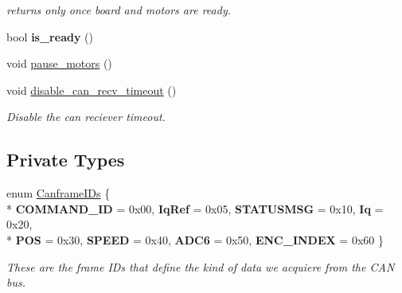 \begin{DoxyCompactItemize}
\begin{DoxyCompactList}\small\item\em returns only once board and motors are ready. \end{DoxyCompactList}\item 
bool {\bfseries is\+\_\+ready} ()\hypertarget{classblmc__drivers_1_1CanBusMotorBoard_aecd2ba0d3d1f40ffd38a0fd47b8da55d}{}\label{classblmc__drivers_1_1CanBusMotorBoard_aecd2ba0d3d1f40ffd38a0fd47b8da55d}

\item 
void \hyperlink{classblmc__drivers_1_1CanBusMotorBoard_a19ffd7d9ef9a441299164485e85ec6fd}{pause\+\_\+motors} ()
\item 
void \hyperlink{classblmc__drivers_1_1CanBusMotorBoard_a846382d2ad74d2087f5557ecd90937e3}{disable\+\_\+can\+\_\+recv\+\_\+timeout} ()\hypertarget{classblmc__drivers_1_1CanBusMotorBoard_a846382d2ad74d2087f5557ecd90937e3}{}\label{classblmc__drivers_1_1CanBusMotorBoard_a846382d2ad74d2087f5557ecd90937e3}

\begin{DoxyCompactList}\small\item\em Disable the can reciever timeout. \end{DoxyCompactList}\end{DoxyCompactItemize}
\subsection*{Private Types}
\begin{DoxyCompactItemize}
\item 
enum \hyperlink{classblmc__drivers_1_1CanBusMotorBoard_addbf32fe0b6fa57134546c1f6ec5eb80}{Canframe\+I\+Ds} \{ \\*
{\bfseries C\+O\+M\+M\+A\+N\+D\+\_\+\+ID} = 0x00, 
{\bfseries Iq\+Ref} = 0x05, 
{\bfseries S\+T\+A\+T\+U\+S\+M\+SG} = 0x10, 
{\bfseries Iq} = 0x20, 
\\*
{\bfseries P\+OS} = 0x30, 
{\bfseries S\+P\+E\+ED} = 0x40, 
{\bfseries A\+D\+C6} = 0x50, 
{\bfseries E\+N\+C\+\_\+\+I\+N\+D\+EX} = 0x60
 \}\hypertarget{classblmc__drivers_1_1CanBusMotorBoard_addbf32fe0b6fa57134546c1f6ec5eb80}{}\label{classblmc__drivers_1_1CanBusMotorBoard_addbf32fe0b6fa57134546c1f6ec5eb80}
\begin{DoxyCompactList}\small\item\em These are the frame I\+Ds that define the kind of data we acquiere from the C\+AN bus. \end{DoxyCompactList}
\end{DoxyCompactItemize}
